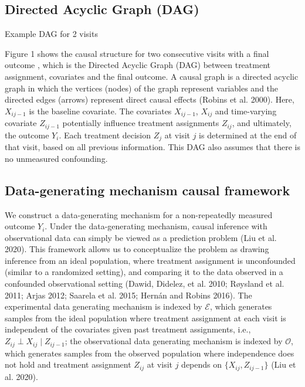 \subsection{Directed Acyclic Graph (DAG)}\label{directed-acyclic-graph-dag}

\label{fig:figs}Example DAG for 2 visits

Figure 1 shows the causal structure for two consecutive visits with a final outcome , which is
the Directed Acyclic Graph (DAG) between treatment assignment,
covariates and the final outcome. A causal graph is a directed acyclic
graph in which the vertices (nodes) of the graph represent variables and
the directed edges (arrows) represent direct causal effects
(Robins et al. 2000). Here, \(X_{ij-1}\) is the baseline
covariate. The covariates \(X_{ij-1}\), \(X_{ij}\) and time-varying covariate
\(Z_{ij-1}\) potentially influence treatment assignments \(Z_{ij}\), and
ultimately, the outcome \(Y_{i}\). Each treatment decision \(Z_j\) at visit \(j\)
is determined at the end of that visit, based on all previous
information. This DAG also assumes that there is no unmeasured
confounding.

\subsection{Data-generating mechanism causal framework}\label{data-generating-mechanism-causal-framework}

We construct a data-generating mechanism for a
non-repeatedly measured outcome \(Y_{i}\). Under the data-generating
mechanism, causal inference with observational data can simply be viewed
as a prediction problem (Liu et al. 2020). This framework allows us to conceptualize the problem as drawing inference from an ideal population, where treatment assignment is unconfounded (similar to a randomized setting), and comparing it to the data observed in a confounded observational setting (Dawid, Didelez, et al. 2010; Røysland et al. 2011; Arjas 2012; Saarela et al. 2015; Hernán and Robins 2016). The experimental data generating mechanism is
indexed by \(\mathcal{E}\), which generates samples from the ideal
population where treatment assignment at each visit is independent of
the covariates given past treatment assignments, i.e.,
\(Z_{ij} \perp X_{ij} \mid Z_{ij-1}\); the observational data generating
mechanism is indexed by \(\mathcal{O}\), which generates samples from the
observed population where independence does not hold and treatment
assignment \(Z_{ij}\) at visit \(j\) depends on \(\{X_{ij}, Z_{ij-1}\}\) (Liu et al. 2020).

